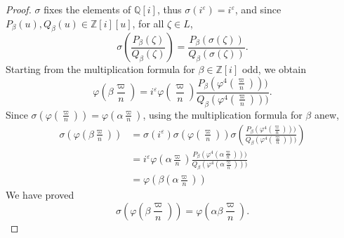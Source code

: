\documentclass[11pt,a4paper]{article}
\newcommand{\Q}{\mathbb{Q}}
\newcommand{\Z}{\mathbb{Z}}
\begin{document}
\begin{proof} $\sigma$ fixes the elements of $\Q[i]$, thus $\sigma(i^\varepsilon) = i^\varepsilon$, and since $P_\beta(u), Q_\beta(u) \in \Z[i][u]$, for all $\zeta  \in L$,
$$\sigma \left(\frac{P_\beta(\zeta)}{Q_\beta(\zeta) } \right)= \frac{P_\beta(\sigma(\zeta))}{Q_\beta(\sigma(\zeta))}.$$
Starting from the multiplication formula for $\beta \in \Z[i]$ odd, we obtain
$$\varphi\left(\beta \frac{\varpi}{n}\right) = i^\varepsilon \varphi\left(\frac{\varpi}{n}\right) \frac{P_\beta\left(\varphi^4(\frac{\varpi}{n})\right))}{Q_\beta\left(\varphi^4(\frac{\varpi}{n})\right))}.$$
Since $\sigma \left(\varphi \left(\frac{\varpi}{n} \right)\right) = \varphi\left(\alpha \frac{\varpi}{n} \right)$, using the multiplication formula for $\beta$ anew,
\begin{align*}
\sigma \left(\varphi\left(\beta \frac{\varpi}{n} \right) \right)&= \sigma(i^\varepsilon)\sigma\left( \varphi\left(\frac{\varpi}{n}\right)\right) \sigma \left( \frac{P_\beta\left(\varphi^4(\frac{\varpi}{n})\right)) }{Q_\beta\left(\varphi^4(\frac{\varpi}{n})\right))} \right)\\
&= i^\varepsilon \varphi\left(\alpha \frac{\varpi}{n}\right) \frac{P_\beta\left(\varphi^4(\alpha \frac{\varpi}{n})\right))}{Q_\beta\left(\varphi^4( \alpha \frac{\varpi}{n})\right))}\\
&= \varphi\left( \beta\left ( \alpha  \frac{\varpi}{n} \right)\right) 
\end{align*}
We have proved
$$\sigma \left(\varphi\left(\beta \frac{\varpi}{n} \right) \right) = \varphi\left(\alpha \beta \frac{\varpi}{n} \right).$$
\end{proof}
\end{document}
